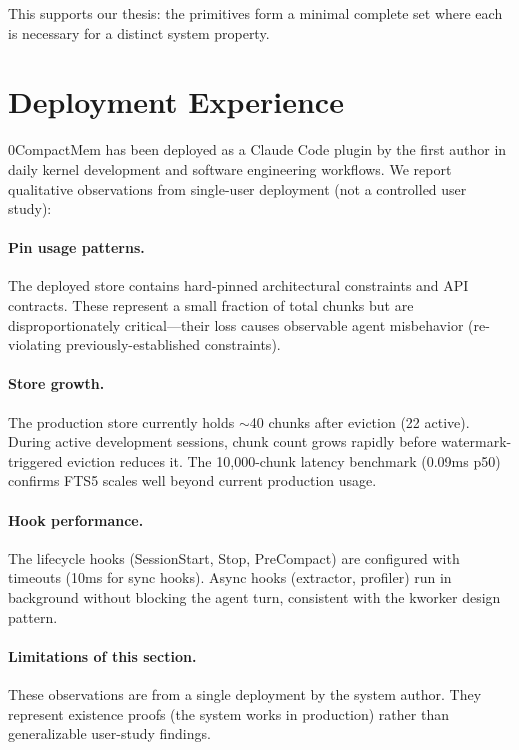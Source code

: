 \documentclass[10pt,twocolumn]{article}
\begin{document}
This supports our thesis: the primitives form a minimal complete set where each is necessary for a distinct system property.

\section{Deployment Experience}
\label{sec:deployment}

0CompactMem has been deployed as a Claude Code plugin by the first author in daily kernel development and software engineering workflows. We report qualitative observations from single-user deployment (not a controlled user study):

\paragraph{Pin usage patterns.} The deployed store contains hard-pinned architectural constraints and API contracts. These represent a small fraction of total chunks but are disproportionately critical---their loss causes observable agent misbehavior (re-violating previously-established constraints).

\paragraph{Store growth.} The production store currently holds $\sim$40 chunks after eviction (22 active). During active development sessions, chunk count grows rapidly before watermark-triggered eviction reduces it. The 10{,}000-chunk latency benchmark (0.09ms p50) confirms FTS5 scales well beyond current production usage.

\paragraph{Hook performance.} The lifecycle hooks (SessionStart, Stop, PreCompact) are configured with timeouts (10ms for sync hooks). Async hooks (extractor, profiler) run in background without blocking the agent turn, consistent with the kworker design pattern.

\paragraph{Limitations of this section.} These observations are from a single deployment by the system author. They represent existence proofs (the system works in production) rather than generalizable user-study findings.
\end{document}
